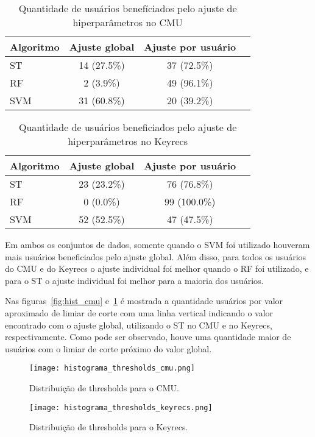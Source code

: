 \begin{table}[htbp]
\centering
\caption{Quantidade de usuários benefíciados pelo ajuste de hiperparâmetros no CMU}
\label{tab:cmu_hp_comparison}
\begin{tabular}{|l|c|c|c|}
\hline
\textbf{Algoritmo} & \textbf{Ajuste global} & \textbf{Ajuste por usuário} \\
\hline
ST & 14 (27.5\%) & 37 (72.5\%) \\
\hline
RF & 2 (3.9\%) & 49 (96.1\%) \\
\hline
SVM & 31 (60.8\%) & 20 (39.2\%) \\
\hline
\end{tabular}
\end{table}

\begin{table}[htbp]
\centering
\caption{Quantidade de usuários beneficiados pelo ajuste de hiperparâmetros no Keyrecs}
\label{tab:keyrecs_hp_comparison}
\begin{tabular}{|l|c|c|c|}
\hline
\textbf{Algoritmo} & \textbf{Ajuste global} & \textbf{Ajuste por usuário} \\
\hline
ST & 23 (23.2\%) & 76 (76.8\%) \\
\hline
RF & 0 (0.0\%) & 99 (100.0\%) \\
\hline
SVM & 52 (52.5\%) & 47 (47.5\%) \\
\hline
\end{tabular}
\end{table}

Em ambos os conjuntos de dados, somente quando o SVM foi utilizado houveram mais usuários beneficiados pelo ajuste global. Além disso, para todos os usuários do CMU e do Keyrecs o ajuste individual foi melhor quando o RF foi utilizado, e para o ST o ajuste individual foi melhor para a maioria dos usuários.

Nas figuras~\ref{fig:hist_cmu} e~\ref{fig:hist_keyrecs} é mostrada a quantidade usuários por valor aproximado de limiar de corte com uma linha vertical indicando o valor encontrado com o ajuste global, utilizando o ST no CMU e no Keyrecs, respectivamente. Como pode ser observado, houve uma quantidade maior de usuários com o limiar de corte próximo do valor global.

\begin{figure}[h!]
    \centering
    \begin{minipage}{0.48\textwidth}
        \centering
        \texttt{[image: histograma\_thresholds\_cmu.png]}
        \caption{Distribuição de thresholds para o CMU.}
        \label{fig:hist_cmu}
    \end{minipage}
    \hfill 
    \begin{minipage}{0.48\textwidth}
        \centering
        \texttt{[image: histograma\_thresholds\_keyrecs.png]}
        \caption{Distribuição de thresholds para o Keyrecs.}
        \label{fig:hist_keyrecs}
    \end{minipage}
\end{figure}

